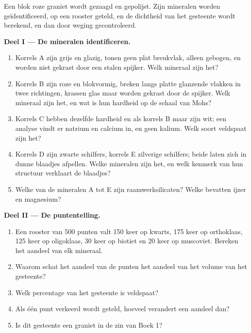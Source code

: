 \begin{problem}
\label{pb:g11:minerals:1}
Een blok roze graniet wordt gezaagd en gepolijst. Zijn mineralen worden geïdentificeerd,
op een rooster geteld, en de dichtheid van het gesteente wordt berekend, en dan door
weging gecontroleerd.

\medskip
\noindent\textbf{Deel I --- De mineralen identificeren.}
\begin{enumerate}
  \item Korrels A zijn grijs en glazig, tonen geen plat breukvlak, alleen
        gebogen, en worden niet gekrast door een stalen spijker. Welk mineraal
        zijn het?
  \item Korrels B zijn roze en blokvormig, breken langs platte glanzende vlakken in
        twee richtingen, krassen glas maar worden gekrast door de spijker. Welk
        mineraal zijn het, en wat is hun hardheid op de schaal van Mohs?
  \item Korrels C hebben dezelfde hardheid en  als korrels B maar zijn
        wit; een analyse vindt er natrium en calcium in, en geen
        kalium. Welk soort veldspaat zijn het?
  \item Korrels D zijn zwarte schilfers, korrels E zilverige schilfers; beide laten zich in
        dunne blaadjes afpellen. Welke mineralen zijn het, en welk kenmerk van hun
        structuur verklaart de blaadjes?
  \item Welke van de mineralen A tot E zijn raamwerksilicaten? Welke bevatten
        ijzer en magnesium?
\end{enumerate}

\medskip
\noindent\textbf{Deel II --- De puntentelling.}
\begin{enumerate}[resume]
  \item Een rooster van 500 punten valt 150 keer op kwarts, 175 keer op
        orthoklaas, 125 keer op oligoklaas, 30 keer op biotiet en 20 keer
        op muscoviet. Bereken het aandeel van elk mineraal.
  \item Waarom schat het aandeel van de punten het aandeel van het volume
        van het gesteente?
  \item Welk percentage van het gesteente is veldspaat?
  \item Als één punt verkeerd wordt geteld, hoeveel verandert een aandeel dan?
  \item Is dit gesteente een graniet in de zin van Boek 1?
\end{enumerate}


\end{problem}
